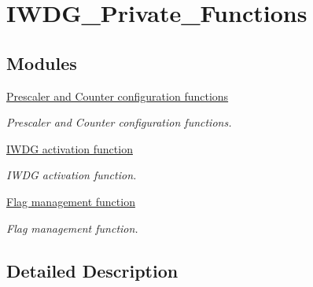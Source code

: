 \hypertarget{group___i_w_d_g___private___functions}{\section{I\-W\-D\-G\-\_\-\-Private\-\_\-\-Functions}
\label{group___i_w_d_g___private___functions}
}
\subsection*{Modules}
\begin{DoxyCompactItemize}
\item 
\hyperlink{group___i_w_d_g___group1}{Prescaler and Counter configuration functions}
\begin{DoxyCompactList}\small\item\em Prescaler and Counter configuration functions. \end{DoxyCompactList}\item 
\hyperlink{group___i_w_d_g___group2}{I\-W\-D\-G activation function}
\begin{DoxyCompactList}\small\item\em I\-W\-D\-G activation function. \end{DoxyCompactList}\item 
\hyperlink{group___i_w_d_g___group3}{Flag management function}
\begin{DoxyCompactList}\small\item\em Flag management function. \end{DoxyCompactList}\end{DoxyCompactItemize}


\subsection{Detailed Description}
